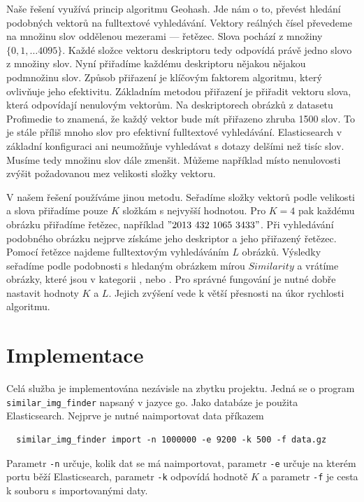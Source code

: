 Naše řešení využívá princip algoritmu Geohash. Jde nám o to, převést hledání podobných vektorů na fulltextové vyhledávání. Vektory reálných čísel převedeme na množinu slov oddělenou mezerami --- řetězec. Slova pochází z množiny $\{0, 1,… 4095\}$. Každé složce vektoru deskriptoru tedy odpovídá právě jedno slovo z množiny slov. Nyní přiřadíme každému deskriptoru nějakou nějakou podmnožinu slov. Způsob přiřazení je klíčovým faktorem algoritmu, který ovlivňuje jeho efektivitu. Základním metodou přiřazení je přiřadit vektoru slova, která odpovídají nenulovým vektorům. Na deskriptorech obrázků z datasetu Profimedie to znamená, že každý vektor bude mít přiřazeno zhruba 1500 slov. To je stále příliš mnoho slov pro efektivní fulltextové vyhledávání. Elasticsearch v základní konfiguraci ani neumožňuje vyhledávat s dotazy delšími než tisíc slov. Musíme tedy množinu slov dále zmenšit. Můžeme například místo nenulovosti zvýšit požadovanou mez velikosti složky vektoru.

V našem řešení používáme jinou metodu. Seřadíme složky vektorů podle velikosti a slova přiřadíme pouze $K$ složkám s nejvyšší hodnotou. Pro $K = 4$ pak každému obrázku přiřadíme řetězec, například $\mathrm{"}2013\ 432\ 1065\ 3433\mathrm{"}$. Při vyhledávání podobného obrázku nejprve získáme jeho deskriptor a jeho přiřazený řetězec. Pomocí řetězce najdeme fulltextovým vyhledáváním $L$ obrázků. Výsledky seřadíme podle podobnosti s hledaným obrázkem mírou $Similarity$ a vrátíme obrázky, které jsou v kategorii , nebo . Pro správné fungování je nutné dobře nastavit hodnoty $K$ a $L$. Jejich zvýšení vede k větší přesnosti na úkor rychlosti algoritmu.

\section{Implementace}

Celá služba je implementována nezávisle na zbytku projektu. Jedná se o program \lstinline{similar_img_finder} napsaný v jazyce go. Jako databáze je použita Elasticsearch. Nejprve je nutné naimportovat data příkazem

\begin{lstlisting}
  similar_img_finder import -n 1000000 -e 9200 -k 500 -f data.gz
\end{lstlisting}

Parametr \lstinline{-n} určuje, kolik dat se má naimportovat, parametr \lstinline{-e} určuje na kterém portu běží Elasticsearch, parametr \lstinline{-k} odpovídá hodnotě $K$ a parametr \lstinline{-f} je cesta k souboru s importovanými daty.

